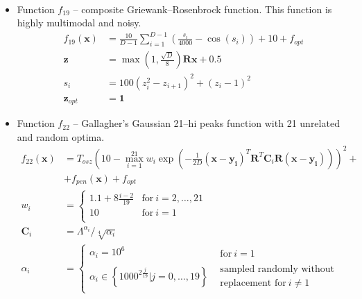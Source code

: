 \begin{itemize}
\begin{align*}
    \end{align*}
    \item Function $f_{19}$ -- composite Griewank--Rosenbrock function. This function is highly multimodal and noisy.
    \begin{align*}
        f_{19}\left(\mathbf{x}\right) &= \frac{10}{D-1}\sum_{i=1}^{D-1}\left( \frac{s_i}{4000} - \cos\left(s_i\right) \right) + 10 + f_{opt}\\
        \mathbf{z} &= \max\left(1,\frac{\sqrt{D}}{8}\right)\mathbf{R}\mathbf{x}+0.5 \\
        s_i &= 100 \left(z_i^2 - z_{i+1}\right)^2 + \left(z_i-1\right)^2 \\
        \mathbf{z}_{opt} &= \mathbf{1}
    \end{align*}
    \item Function $f_{22}$ -- Gallagher's Gaussian 21--hi peaks function with 21 unrelated and random optima.
    \begin{align*}
        f_{22}\left(\mathbf{x}\right) &= T_{osz}\left( 
            10 - \max_{i=1}^{21} w_i \exp\left( -\frac{1}{2D}\left(\mathbf{x}-\mathbf{y_i}\right)^T\mathbf{R}^T\mathbf{C}_i\mathbf{R}\left(\mathbf{x}-\mathbf{y_i}\right) \right) 
        \right)^2 + \\
        & + f_{pen}(\mathbf{x}) + f_{opt} \\
        w_i &= \left\{
            \begin{array}{ll}
                1.1+8\frac{i-2}{19} & \text{for}\ i=2,\dots,21 \\
                10                  & \text{for}\ i=1 \\
            \end{array}
        \right.
        \\
        \mathbf{C}_i &= \Lambda^{\alpha_i} / \sqrt[4]{\alpha_i} \\
        \alpha_i &= \left\{ 
            \begin{array}{ll}
                \alpha_i = 10^6 & 
                    \begin{array}{l}
                        \text{for}\ i=1
                    \end{array} \\
                \alpha_i \in \left\{1000^{2\frac{j}{19}}|j=0,\dots,19\right\} &
                    \begin{array}{l}
                        \text{sampled randomly without} \\
                        \text{replacement for}\ i \neq 1

\end{array}
\end{array}
\end{align*}
\end{itemize}

